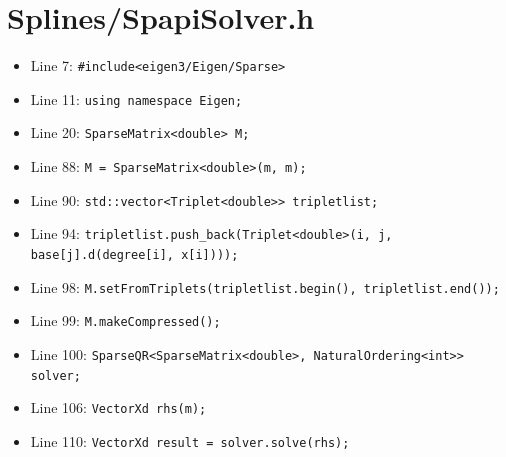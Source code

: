 \documentclass[a4paper,7pt,onecolumn,oneside]{article}
\begin{document}
\section{Splines/SpapiSolver.h}

\begin{itemize}
    \item Line 7: \texttt{\#include<eigen3/Eigen/Sparse>}
    \item Line 11: \texttt{using namespace Eigen;}
    \item Line 20: \texttt{SparseMatrix<double> M;}
    \item Line 88: \texttt{M = SparseMatrix<double>(m, m);}
    \item Line 90: \texttt{std::vector<Triplet<double>> tripletlist;}
    \item Line 94: \texttt{tripletlist.push\_back(Triplet<double>(i, j, base[j].d(degree[i], x[i])));}
    \item Line 98: \texttt{M.setFromTriplets(tripletlist.begin(), tripletlist.end());}
    \item Line 99: \texttt{M.makeCompressed();}
    \item Line 100: \texttt{SparseQR<SparseMatrix<double>, NaturalOrdering<int>> solver;}
    \item Line 106: \texttt{VectorXd rhs(m);}
    \item Line 110: \texttt{VectorXd result = solver.solve(rhs);}
\end{itemize}
\end{document}
